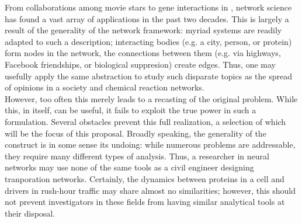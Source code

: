\documentclass[11pt]{article}
\begin{document}
From collaborations among movie stars \cite{Barabasi1999} to gene interactions in  \cite{Dreze2009}, network science has found a vast array of applications in the past two decades. This is largely a result of the generality of the network framework: myriad systems are readily adapted to such a description; interacting bodies (e.g. a city, person, or protein) form nodes in the network, the connections between them (e.g. via highways, Facebook friendships, or biological suppresion) create edges. Thus, one may usefully apply the same abstraction to study such disparate topics as the spread of opinions in a society and chemical reaction networks. \vspace{1mm}\\
However, too often this merely leads to a recasting of the original problem. While this, in itself, can be useful, it fails to exploit the true power in such a formulation. Several obstacles prevent this full realization, a selection of which will be the focus of this proposal. Broadly speaking, the generality of the construct is in some sense its undoing: while numerous problems are addressable, they require many different types of analysis. Thus, a researcher in neural networks may use none of the same tools as a civil engineer designing tranporation networks. Certainly, the dynamics between proteins in a cell and drivers in rush-hour traffic may share almost no similarities; however, this should not prevent investigators in these fields from having similar analytical tools at their disposal.\vspace{1mm}\\ %
\end{document}
